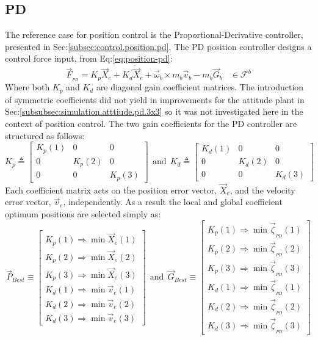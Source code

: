 \subsection{PD}
\label{subsec:simulation.position.pd}
The reference case for position control is the Proportional-Derivative controller, presented in Sec:\ref{subsec:control.position.pd}. The PD position controller designs a control force input, from Eq:\ref{eq:position-pd}:
\begin{equation}
\vec{F}_{_{PD}}=K_p\vec{X}_e + K_d\dot{\vec{X}}_e + \vec{\omega}_b\times m_b\vec{v}_b-m_b\vec{G}_b~~~~\in\mathcal{F}^{b}
\end{equation}
Where both $K_p$ and $K_d$ are diagonal gain coefficient matrices. The introduction of symmetric coefficients did not yield in improvements for the attitude plant in Sec:\ref{subsubsec:simulation.atttiude.pd.3x3} so it was not investigated here in the context of position control. The two gain coefficients for the PD controller are structured as follows:
\begin{equation}\label{eq:simulation-attitde-pd-diagonal-coefficients}
K_p\triangleq \begin{bmatrix}
K_p(1) & 0 & 0\\
0 & K_p(2) & 0\\
0 & 0 & K_p(3)
\end{bmatrix}
~~\text{and}~~K_d\triangleq \begin{bmatrix}
K_d(1) & 0 & 0\\
0 & K_d(2) & 0\\
0 & 0 & K_d(3)
\end{bmatrix}
\end{equation}
Each coefficient matrix acts on the position error vector, $\vec{X}_e$, and the velocity error vector, $\vec{v}_e$, independently. As a result the local and global coefficient optimum positions are selected simply as:
\begin{equation}
\vec{P}_{Best}\equiv
\begin{bmatrix}
K_p(1)\Rightarrow \min \vec{X}_e(1)\\
K_p(2)\Rightarrow \min \vec{X}_e(2)\\
K_p(3)\Rightarrow \min \vec{X}_e(3)\\
K_d(1)\Rightarrow \min \vec{v}_e(1)\\
K_d(2)\Rightarrow \min \vec{v}_e(2)\\
K_d(3)\Rightarrow \min \vec{v}_e(3)
\end{bmatrix}~~\text{and}~~\vec{G}_{Best}\equiv\begin{bmatrix}
K_p(1)\Rightarrow \min \vec{\zeta}_{_{PD}}(1)\\
K_p(2)\Rightarrow \min \vec{\zeta}_{_{PD}}(2)\\
K_p(3)\Rightarrow \min \vec{\zeta}_{_{PD}}(3)\\
K_d(1)\Rightarrow \min \vec{\zeta}_{_{PD}}(1)\\
K_d(2)\Rightarrow \min \vec{\zeta}_{_{PD}}(2)\\
K_d(3)\Rightarrow \min \vec{\zeta}_{_{PD}}(3)
\end{bmatrix}
\end{equation}
